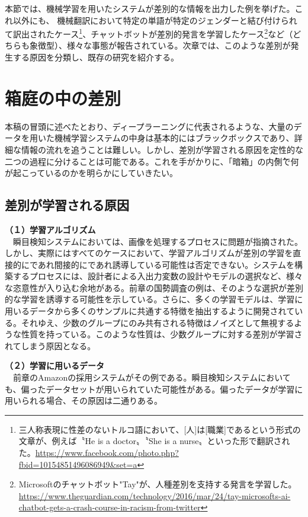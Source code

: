 \documentclass[b5j,twoside,twocolumn]{utarticle}
\begin{document}
本節では、機械学習を用いたシステムが差別的な情報を出力した例を挙げた。これ以外にも、
機械翻訳において特定の単語が特定のジェンダーと結び付けられて訳出されたケース\footnote{三人称表現に性差のないトルコ語において、[人]は[職業]であるという形式の文章が、例えば〝He is a doctor〟〝She is a nurse〟といった形で翻訳された。\url{https://www.facebook.com/photo.php?fbid=10154851496086949&set=a}}、チャットボットが差別的発言を学習したケース\footnote{Microsoftのチャットボット"Tay"が、人種差別を支持する発言を学習した。\\\url{https://www.theguardian.com/technology/2016/mar/24/tay-microsofts-ai-chatbot-gets-a-crash-course-in-racism-from-twitter}}など（どちらも象徴型）、様々な事態が報告されている。次章では、このような差別が発生する原因を分類し、既存の研究を紹介する。
\section{箱庭の中の差別}
本稿の冒頭に述べたとおり、ディープラーニングに代表されるような、大量のデータを用いた機械学習システムの中身は基本的にはブラックボックスであり、詳細な情報の流れを追うことは難しい。しかし、差別が学習される原因を定性的な二つの過程に分けることは可能である。これを手がかりに、「暗箱」の\.内\.側で何が起こっているのかを明らかにしていきたい。
\subsection{差別が学習される原因}
\textbf{（１）学習アルゴリズム}\\
~~瞬目検知システムにおいては、画像を処理するプロセスに問題が指摘された。
しかし、実際にはすべてのケースにおいて、学習アルゴリズムが差別の学習を直接的にであれ間接的にであれ誘導している可能性は否定できない。システムを構築するプロセスには、設計者による入出力変数の設計やモデルの選択など、様々な恣意性が入り込む余地がある。前章の国勢調査の例は、そのような選択が差別的な学習を誘導する可能性を示している。さらに、多くの学習モデルは、学習に用いるデータから多くのサンプルに共通する特徴を抽出するように開発されている。それゆえ、少数のグループにのみ共有される特徴はノイズとして無視するような性質を持っている。このような性質は、少数グループに対する差別が学習されてしまう原因となる。


\textbf{（２）学習に用いるデータ}\\
~~前章のAmazonの採用システムがその例である。瞬目検知システムにおいても、偏ったデータセットが用いられていた可能性がある。偏ったデータが学習に用いられる場合、その原因は二通りある。
\end{document}
